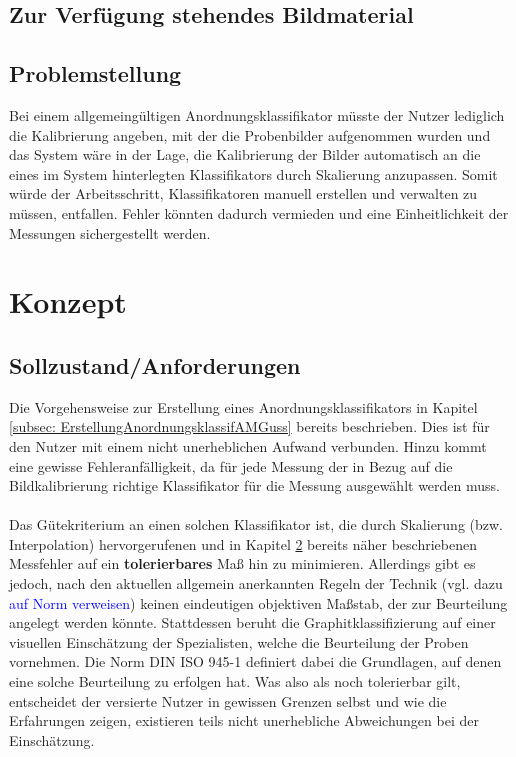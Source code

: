 \documentclass[
fontsize=10pt, 
listof = totoc,
parskip = half	
]{report}
\begin{document}
\section{Zur Verfügung stehendes Bildmaterial}
\label{subsec:Bildmaterial}

\section{Problemstellung}
\label{sec:Problemstellung}

Bei einem allgemeingültigen Anordnungsklassifikator müsste der Nutzer lediglich die Kalibrierung angeben, mit der die Probenbilder aufgenommen wurden und das System wäre in der Lage, die Kalibrierung der Bilder automatisch an die eines im System hinterlegten Klassifikators durch Skalierung anzupassen. Somit würde der Arbeitsschritt, Klassifikatoren manuell erstellen und  verwalten zu müssen, entfallen. Fehler könnten dadurch vermieden und eine Einheitlichkeit der Messungen sichergestellt werden.

\chapter{Konzept}
\label{ch:Konzept}

\section{Sollzustand/Anforderungen}
\label{sec:DefAnforderungenAnordnKlas}
Die Vorgehensweise zur Erstellung eines Anordnungsklassifikators in Kapitel \ref{subsec: ErstellungAnordnungsklassifAMGuss} bereits beschrieben. Dies ist für den Nutzer mit einem nicht unerheblichen Aufwand verbunden. Hinzu kommt eine gewisse Fehleranfälligkeit, da für jede Messung der in Bezug auf die Bildkalibrierung richtige Klassifikator für die Messung ausgewählt werden muss.
\\\\
\noindent Das Gütekriterium an einen solchen Klassifikator ist, die durch Skalierung (bzw. Interpolation) hervorgerufenen und in Kapitel \ref{sec:Problemstellung} bereits näher beschriebenen Messfehler auf ein \textbf{tolerierbares} Maß hin zu minimieren. Allerdings gibt es jedoch, nach den aktuellen allgemein anerkannten Regeln der Technik (vgl. dazu \textcolor{blue}{auf Norm verweisen}) keinen eindeutigen objektiven Maßstab, der zur Beurteilung angelegt werden könnte. Stattdessen beruht die Graphitklassifizierung auf einer visuellen Einschätzung der Spezialisten, welche die Beurteilung der Proben vornehmen. Die Norm DIN ISO 945-1 definiert dabei die Grundlagen, auf denen eine solche Beurteilung zu erfolgen hat. Was also als noch tolerierbar gilt, entscheidet der versierte Nutzer in gewissen Grenzen selbst und wie die Erfahrungen zeigen, existieren teils nicht unerhebliche Abweichungen bei der Einschätzung. 
\end{document}
